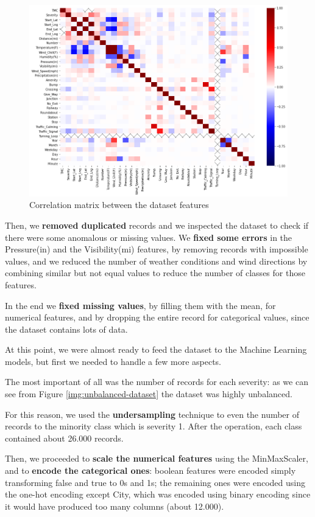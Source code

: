 \documentclass{article}
\begin{document}
\begin{figure}[h!]
\centering
\includegraphics[width=\textwidth]{correlation-matrix}
\caption{Correlation matrix between the dataset features}
\label{img:corr-matrix}
\end{figure}

Then, we \textbf{removed duplicated} records and we inspected the dataset to check if there were some anomalous or missing values.
We \textbf{fixed some errors} in the Pressure(in) and the Visibility(mi) features, by removing records with impossible values, and we reduced the number of weather conditions and wind directions by combining similar but not equal values to reduce the number of classes for those features. 

In the end we \textbf{fixed missing values}, by filling them with the mean, for numerical features, and by dropping the entire record for categorical values, since the dataset contains lots of data.

At this point, we were almost ready to feed the dataset to the Machine Learning models, but first we needed to handle a few more aspects.

The most important of all was the number of records for each severity: as we can see from Figure \ref{img:unbalanced-dataset} the dataset was highly unbalanced.

For this reason, we used the \textbf{undersampling} technique to even the number of records to the minority class which is severity 1. After the operation, each class contained about 26.000 records.

Then, we proceeded to \textbf{scale the numerical features} using the MinMaxScaler, and to \textbf{encode the categorical ones}: boolean features were encoded simply transforming false and true to 0s and 1s; the remaining ones were encoded using the one-hot encoding except City, which was encoded using binary encoding since it would have produced too many columns (about 12.000).
\end{document}
